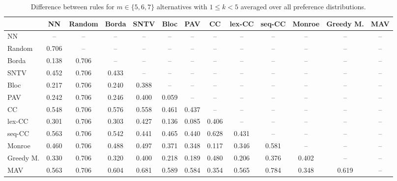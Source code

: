 
\begin{table*}[htbp]
\centering
\begin{tabular}{lcccccccccccc}
\toprule
 & NN & Random & Borda & SNTV & Bloc & PAV & CC & lex-CC & seq-CC & Monroe & Greedy M. & MAV \\
\midrule
NN & -- & -- & -- & -- & -- & -- & -- & -- & -- & -- & -- & -- \\
Random & \cellcolor{blue!70} 0.706 & -- & -- & -- & -- & -- & -- & -- & -- & -- & -- & -- \\
Borda & \cellcolor{blue!13} 0.138 & \cellcolor{blue!70} 0.706 & -- & -- & -- & -- & -- & -- & -- & -- & -- & -- \\
SNTV & \cellcolor{blue!45} 0.452 & \cellcolor{blue!70} 0.706 & \cellcolor{blue!43} 0.433 & -- & -- & -- & -- & -- & -- & -- & -- & -- \\
Bloc & \cellcolor{blue!21} 0.217 & \cellcolor{blue!70} 0.706 & \cellcolor{blue!24} 0.240 & \cellcolor{blue!38} 0.388 & -- & -- & -- & -- & -- & -- & -- & -- \\
PAV & \cellcolor{blue!24} 0.242 & \cellcolor{blue!70} 0.706 & \cellcolor{blue!24} 0.246 & \cellcolor{blue!40} 0.400 & \cellcolor{blue!5} 0.059 & -- & -- & -- & -- & -- & -- & -- \\
CC & \cellcolor{blue!54} 0.548 & \cellcolor{blue!70} 0.706 & \cellcolor{blue!57} 0.576 & \cellcolor{blue!55} 0.558 & \cellcolor{blue!46} 0.461 & \cellcolor{blue!43} 0.437 & -- & -- & -- & -- & -- & -- \\
lex-CC & \cellcolor{blue!30} 0.301 & \cellcolor{blue!70} 0.706 & \cellcolor{blue!30} 0.303 & \cellcolor{blue!42} 0.427 & \cellcolor{blue!13} 0.136 & \cellcolor{blue!8} 0.085 & \cellcolor{blue!40} 0.406 & -- & -- & -- & -- & -- \\
seq-CC & \cellcolor{blue!56} 0.563 & \cellcolor{blue!70} 0.706 & \cellcolor{blue!54} 0.542 & \cellcolor{blue!44} 0.441 & \cellcolor{blue!46} 0.465 & \cellcolor{blue!44} 0.440 & \cellcolor{blue!62} 0.628 & \cellcolor{blue!43} 0.431 & -- & -- & -- & -- \\
Monroe & \cellcolor{blue!46} 0.460 & \cellcolor{blue!70} 0.706 & \cellcolor{blue!48} 0.488 & \cellcolor{blue!49} 0.497 & \cellcolor{blue!37} 0.371 & \cellcolor{blue!34} 0.348 & \cellcolor{blue!11} 0.117 & \cellcolor{blue!34} 0.346 & \cellcolor{blue!58} 0.581 & -- & -- & -- \\
Greedy M. & \cellcolor{blue!33} 0.330 & \cellcolor{blue!70} 0.706 & \cellcolor{blue!32} 0.320 & \cellcolor{blue!40} 0.400 & \cellcolor{blue!21} 0.218 & \cellcolor{blue!18} 0.189 & \cellcolor{blue!48} 0.480 & \cellcolor{blue!20} 0.206 & \cellcolor{blue!37} 0.376 & \cellcolor{blue!40} 0.402 & -- & -- \\
MAV & \cellcolor{blue!56} 0.563 & \cellcolor{blue!70} 0.706 & \cellcolor{blue!60} 0.604 & \cellcolor{blue!68} 0.681 & \cellcolor{blue!58} 0.589 & \cellcolor{blue!58} 0.584 & \cellcolor{blue!35} 0.354 & \cellcolor{blue!56} 0.565 & \cellcolor{blue!78} 0.784 & \cellcolor{blue!34} 0.348 & \cellcolor{blue!61} 0.619 & -- \\
\bottomrule
\end{tabular}

\caption{Difference between rules for $m \in \{5, 6, 7\}$ alternatives with $1 \leq k < 5$ averaged over all preference distributions.}
\label{tab:rule_distance_heatmap-m=[5, 6, 7]-pref_dist=all}
\end{table*}
    